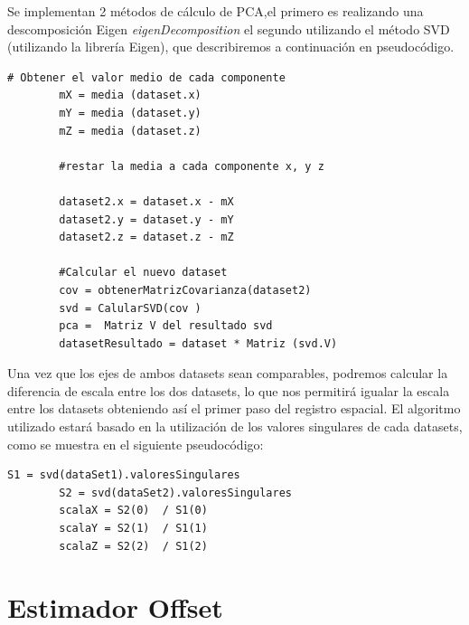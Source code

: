 	Se implementan 2 métodos de cálculo de PCA,el primero es realizando una descomposición Eigen \textit{eigenDecomposition} el segundo utilizando el método SVD (utilizando la librería Eigen), que describiremos a continuación en pseudocódigo.

	\begin{lstlisting}[frame=single]
		# Obtener el valor medio de cada componente
		mX = media (dataset.x)
		mY = media (dataset.y)
		mZ = media (dataset.z)

		#restar la media a cada componente x, y z

		dataset2.x = dataset.x - mX
		dataset2.y = dataset.y - mY
		dataset2.z = dataset.z - mZ
        
        #Calcular el nuevo dataset
		cov = obtenerMatrizCovarianza(dataset2)
		svd = CalularSVD(cov )
		pca =  Matriz V del resultado svd
		datasetResultado = dataset * Matriz (svd.V)

	\end{lstlisting}

    Una vez que los ejes de ambos datasets sean comparables, podremos calcular la diferencia de escala entre los dos datasets, lo que nos permitirá igualar la escala entre los datasets obteniendo así el primer paso del registro espacial. El algoritmo utilizado estará basado en la utilización de los valores singulares de cada datasets, como se muestra en el siguiente pseudocódigo:

        
	\begin{lstlisting}[frame=single]
		S1 = svd(dataSet1).valoresSingulares
		S2 = svd(dataSet2).valoresSingulares
		scalaX = S2(0)  / S1(0)
		scalaY = S2(1)  / S1(1)
		scalaZ = S2(2)  / S1(2)
	\end{lstlisting}

\section{Estimador Offset}

